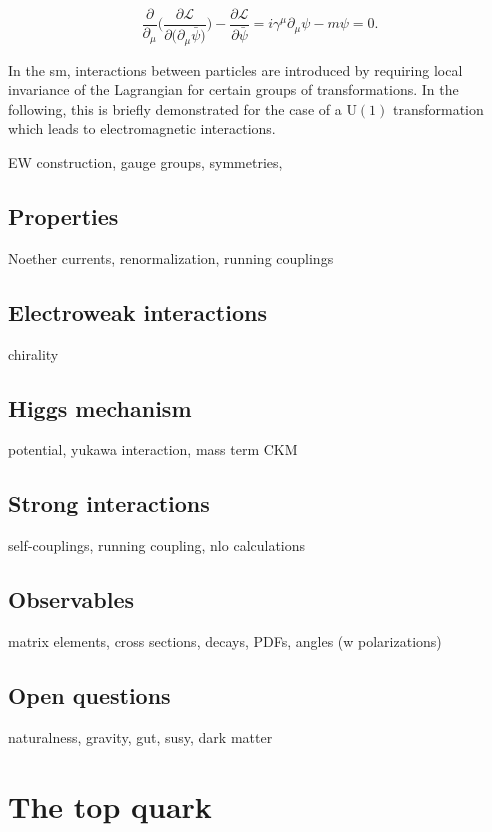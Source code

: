 \begin{equation}
\frac{\partial}{\partial_\mu}\Bigg(\frac{\partial\mathcal{L}}{\partial\big(\partial_\mu\bar{\psi}\big)}\Bigg)-\frac{\partial\mathcal{L}}{\partial\bar{\psi}}=i\gamma^\mu\partial_\mu\psi-m\psi=0.
\end{equation}


In the \gls{sm}, interactions between particles are introduced by requiring local invariance of the Lagrangian for certain groups of transformations. In the following, this is briefly demonstrated for the case of a $\mathrm{U(1)}$ transformation which leads to electromagnetic interactions.


EW construction, gauge groups, symmetries, 

\subsection{Properties}


Noether currents, renormalization, running couplings


\subsection{Electroweak interactions}
\label{sec:theory-ewk}
chirality
\subsection{Higgs mechanism}
potential, yukawa interaction, mass term CKM
\subsection{Strong interactions}
\label{sec:theory-qcd}
self-couplings, running coupling, nlo calculations
\subsection{Observables}
matrix elements, cross sections, decays, PDFs, angles (w polarizations)
\subsection{Open questions}
naturalness, gravity, gut, susy, dark matter

\section{The top quark}
\subsection{}
